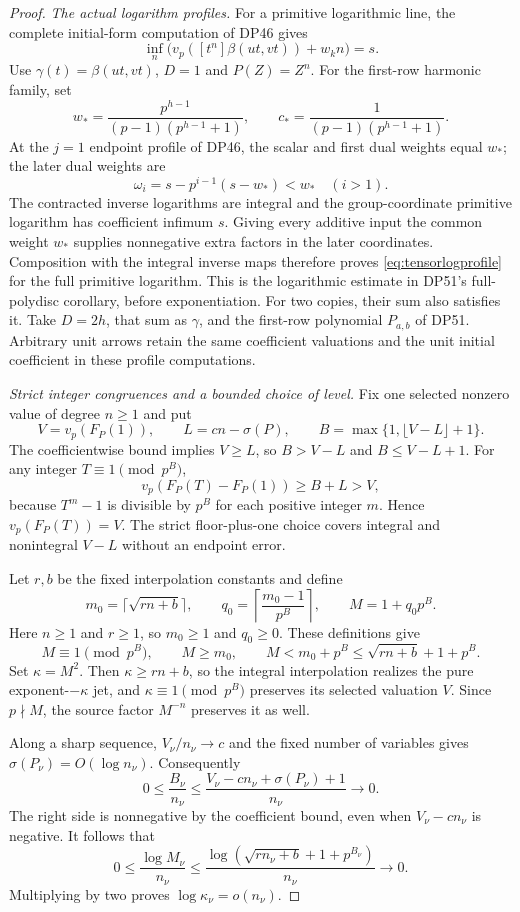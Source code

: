 \begin{proof}
\emph{The actual logarithm profiles.}
For a primitive logarithmic line, the complete initial-form computation of DP46 gives
\[
 \inf_n\bigl(v_p([t^n]\beta(ut,vt))+w_kn\bigr)=s.
\]
Use $\gamma(t)=\beta(ut,vt)$, $D=1$ and $P(Z)=Z^n$.
For the first-row harmonic family, set
\[
 w_*=\frac{p^{h-1}}{(p-1)(p^{h-1}+1)},
 \qquad c_*=\frac1{(p-1)(p^{h-1}+1)}.
\]
At the $j=1$ endpoint profile of DP46, the scalar and first dual weights equal $w_*$; the later dual weights are
\[
 \omega_i=s-p^{i-1}(s-w_*)<w_*\quad(i>1).
\]
The contracted inverse logarithms are integral and the group-coordinate primitive logarithm has coefficient infimum $s$.
Giving every additive input the common weight $w_*$ supplies nonnegative extra factors in the later coordinates.
Composition with the integral inverse maps therefore proves \eqref{eq:tensorlogprofile} for the full primitive logarithm.
This is the logarithmic estimate in DP51's full-polydisc corollary, before exponentiation.
For two copies, their sum also satisfies it. Take $D=2h$, that sum as $\gamma$, and the first-row polynomial $P_{a,b}$ of DP51.
Arbitrary unit arrows retain the same coefficient valuations and the unit initial coefficient in these profile computations.

\emph{Strict integer congruences and a bounded choice of level.}
Fix one selected nonzero value of degree $n\ge1$ and put
\[
 V=v_p(F_P(1)),\qquad L=cn-\sigma(P),\qquad
 B=\max\{1,\lfloor V-L\rfloor+1\}.
\]
The coefficientwise bound implies $V\ge L$, so $B>V-L$ and $B\le V-L+1$.
For any integer $T\equiv1\pmod{p^B}$,
\[
 v_p(F_P(T)-F_P(1))\ge B+L>V,
\]
because $T^m-1$ is divisible by $p^B$ for each positive integer $m$.
Hence $v_p(F_P(T))=V$.
The strict floor-plus-one choice covers integral and nonintegral $V-L$ without an endpoint error.

Let $r,b$ be the fixed interpolation constants and define
\[
 m_0=\lceil\sqrt{rn+b}\rceil,\qquad
 q_0=\left\lceil\frac{m_0-1}{p^B}\right\rceil,
 \qquad M=1+q_0p^B.
\]
Here $n\ge1$ and $r\ge1$, so $m_0\ge1$ and $q_0\ge0$.
These definitions give
\[
 M\equiv1\pmod{p^B},\qquad
 M\ge m_0,\qquad
 M<m_0+p^B\le\sqrt{rn+b}+1+p^B.
\]
Set $\kappa=M^2$. Then $\kappa\ge rn+b$, so the integral interpolation realizes the pure exponent-$-\kappa$ jet, and $\kappa\equiv1\pmod{p^B}$ preserves its selected valuation $V$.
Since $p\nmid M$, the source factor $M^{-n}$ preserves it as well.

Along a sharp sequence, $V_\nu/n_\nu\to c$ and the fixed number of variables gives $\sigma(P_\nu)=O(\log n_\nu)$.
Consequently
\[
 0\le\frac{B_\nu}{n_\nu}
 \le\frac{V_\nu-cn_\nu+\sigma(P_\nu)+1}{n_\nu}
 \longrightarrow0.
\]
The right side is nonnegative by the coefficient bound, even when $V_\nu-cn_\nu$ is negative.
It follows that
\[
 0\le\frac{\log M_\nu}{n_\nu}
 \le\frac{\log(\sqrt{rn_\nu+b}+1+p^{B_\nu})}{n_\nu}
 \longrightarrow0.
\]
Multiplying by two proves $\log\kappa_\nu=o(n_\nu)$.


\end{proof}
